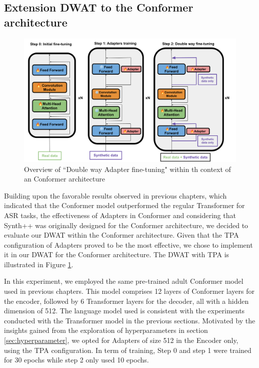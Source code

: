 \subsection{Extension DWAT to the Conformer architecture}
\begin{figure}
    \centering
    \includegraphics[width=\textwidth]{imgs/Overall_system.png}
    \caption{Overview of ``Double way Adapter fine-tuning"  within th context of an Conformer architecture}
    \label{fig:tts_conformer}
\end{figure}
Building upon the favorable results observed in previous chapters, which indicated that the Conformer model outperformed the regular Transformer for ASR tasks, the effectiveness of Adapters in Conformer and  considering that Synth++ \cite{hu2022synt++} was originally designed for the Conformer architecture, we decided to evaluate our DWAT within the Conformer architecture. Given that the TPA configuration of Adapters proved to be the most effective, we chose to implement it in our DWAT for the Conformer architecture. The DWAT with TPA is illustrated in Figure \ref{fig:tts_conformer}.

In this experiment, we employed the same pre-trained adult Conformer model used in previous chapters. This model comprises 12 layers of Conformer layers for the encoder, followed by 6 Transformer layers for the decoder, all with a hidden dimension of 512. The language model used is consistent with the experiments conducted with the Transformer model in the previous sections. Motivated by the insights gained from the exploration of hyperparameters in section \ref{sec:hyperparameter}, we opted for Adapters of size 512 in the Encoder only, using the TPA configuration. In term of training, Step 0 and step 1 were trained for 30 epochs while step 2 only used 10 epochs. 

